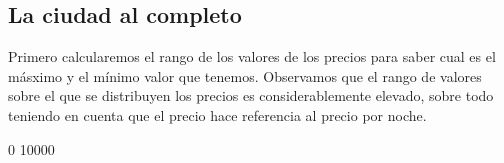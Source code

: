 \documentclass [a4paper] {article}
\begin{document}
\newpage
\subsection{La ciudad al completo}
Primero calcularemos el rango de los valores de los precios para saber cual es el másximo y el mínimo valor que tenemos.
Observamos que el rango de valores sobre el que se distribuyen los precios es considerablemente elevado,
sobre todo teniendo en cuenta que el precio hace referencia al precio por noche.
\begin{Schunk}
\begin{Soutput}
[1]     0 10000
\end{Soutput}
\end{Schunk}
\end{document}
